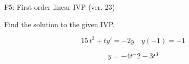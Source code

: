\begin{exercise}
  \begin{exerciseTitle}F5: First order linear IVP (ver. 23)\end{exerciseTitle}
  \begin{exerciseStatement}
    
Find the solution to the given IVP.

    
\[15 \, t^{3} +ty'= -2 y \hspace{1em} y( -1 ) = -1\]

  \end{exerciseStatement}
  \begin{exerciseAnswer}
    
\[y= -4 t^ -2 -3 t^{3}\]

  \end{exerciseAnswer}
\end{exercise}
